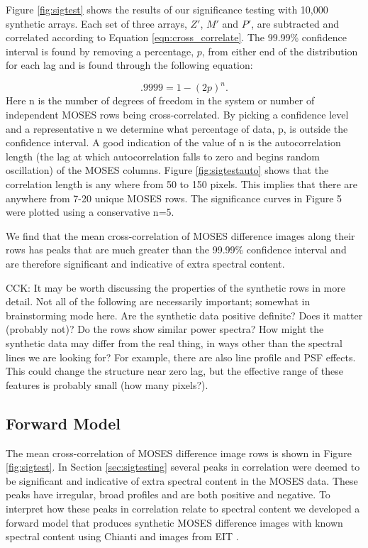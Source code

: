 \documentclass[]{solarphysics}
\newcommand{\cck}[1]{{\color{red} CCK: #1}} %
\begin{document}
\begin{article}
	Figure \ref{fig:sigtest} shows the results of our significance testing with 10,000 synthetic arrays.  Each set of three arrays, $Z'$, $M'$ and $P'$, are subtracted and correlated according to Equation \ref{eqn:cross_correlate}. The 99.99\% confidence interval is found by removing a percentage, $p$, from either end of the distribution for each lag and is found through the following equation:
	
	\begin{equation}
	.9999 = 1-(2p)^n.
	\end{equation}
	Here n is the number of degrees of freedom in the system or number of independent MOSES rows being cross-correlated.  By picking a confidence level and a representative n we determine what percentage of data, p, is outside the confidence interval.  A good indication of the value of n is the autocorrelation length (the lag at which autocorrelation falls to zero and begins random oscillation) of the MOSES columns.  Figure \ref{fig:sigtestauto} shows that the correlation length is any where from 50 to 150 pixels. This implies that there are anywhere from 7-20 unique MOSES rows.  The significance curves in Figure 5 were plotted using a conservative n=5. 
	
	We find that the mean cross-correlation of MOSES difference images along their rows has peaks that are much greater than the 99.99\% confidence interval and are therefore significant and indicative of extra spectral content. 
	
	\cck{It may be worth discussing the properties of the synthetic rows in more detail. Not all of the following are necessarily important; somewhat in brainstorming mode here. Are the synthetic data positive definite? Does it matter (probably not)? Do the rows show similar power spectra? How might the synthetic data may differ from the real thing, in ways other than the spectral lines we are looking for? For example, there are also line profile and PSF effects. This could change the structure near zero lag, but the effective range of these features is probably small (how many pixels?). } 
	
	
	\subsection{Forward Model} 
	The mean cross-correlation of MOSES difference image rows is shown in Figure \ref{fig:sigtest}.  In Section \ref{sec:sigtesting} several peaks in correlation were deemed to be significant and indicative of extra spectral content in the MOSES  data.  These peaks have irregular, broad profiles and are both positive and negative.  To interpret how these peaks in correlation relate to spectral content we developed a forward model that produces synthetic MOSES difference images with known spectral content using Chianti \citep{} and images from EIT \citep{}.  
	


\end{article}
\end{document}
